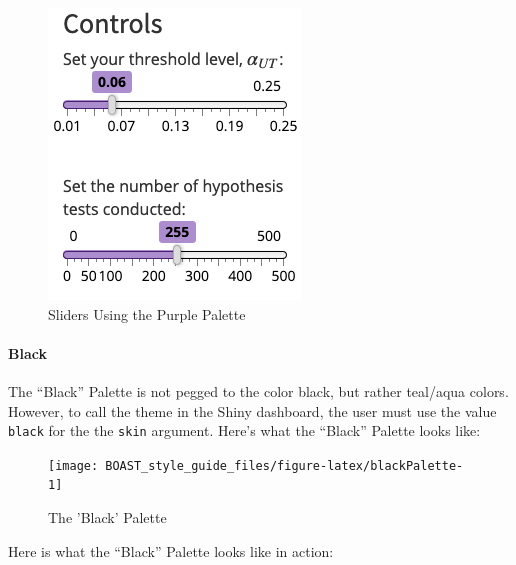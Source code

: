 \documentclass[]{book}
\let\oldparagraph\paragraph
\renewcommand{\paragraph}[1]{\oldparagraph{#1}\mbox{}}
\begin{document}
\begin{figure}

{\centering \includegraphics{images/purpleSliders} 

}

\caption{Sliders Using the Purple Palette}\label{fig:purpleAction3}
\end{figure}

\hypertarget{black}{%
\paragraph{Black}\label{black}}

The ``Black'' Palette is not pegged to the color black, but rather teal/aqua colors. However, to call the theme in the Shiny dashboard, the user must use the value \texttt{black} for the the \texttt{skin} argument. Here's what the ``Black'' Palette looks like:

\begin{figure}

{\centering \texttt{[image: BOAST\_style\_guide\_files/figure-latex/blackPalette-1]} 

}

\caption{The 'Black' Palette}\label{fig:blackPalette}
\end{figure}

Here is what the ``Black'' Palette looks like in action:
\end{document}
